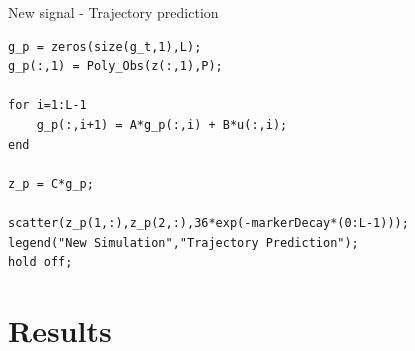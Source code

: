 \documentclass{beamer}
\begin{document}
\begin{frame}[fragile]{New signal - Trajectory prediction}
    \begin{lstlisting}
g_p = zeros(size(g_t,1),L);
g_p(:,1) = Poly_Obs(z(:,1),P);

for i=1:L-1
    g_p(:,i+1) = A*g_p(:,i) + B*u(:,i);
end

z_p = C*g_p;

scatter(z_p(1,:),z_p(2,:),36*exp(-markerDecay*(0:L-1)));
legend("New Simulation","Trajectory Prediction");
hold off;
    \end{lstlisting}
\end{frame}


\section{Results}
\end{document}
